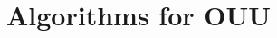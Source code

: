 \documentclass[aspectratio=169,xcolor=dvipsnames,10pt]{beamer}
\begin{document}
\section{Algorithms for OUU}

\end{document}
